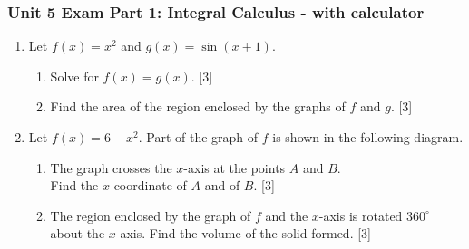 \documentclass[12pt, twoside]{article}
\begin{document}
\subsubsection*{Unit 5 Exam Part 1: Integral Calculus - with calculator}
 \begin{enumerate}

\subsubsection*{You may use a calculator on these problems \hfill [34 marks]}


\item Let $f(x)=x^2$ and $g(x)=\sin(x+1)$.
  \begin{enumerate}
    \item Solve for $f(x)=g(x)$. \hfill [3]
    \item Find the area of the region enclosed by the graphs of $f$ and $g$.  \hfill [3]
  \end{enumerate}

\vspace{2cm}

\item Let $f(x)=6-x^2$. Part of the graph of $f$ is shown in the following diagram.
    \begin{center}
    \end{center}
  \begin{enumerate}
    \item The graph crosses the $x$-axis at the points $A$ and $B$.\\
    Find the $x$-coordinate of $A$ and of $B$. \hfill [3]
    \item The region enclosed by the graph of $f$ and the $x$-axis is rotated $360^\circ$ about the $x$-axis. Find the volume of the solid formed.  \hfill [3]
  \end{enumerate}

\newpage


\end{enumerate}
\end{document}
